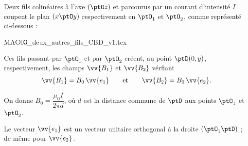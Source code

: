 \hauteurLargeurCadreReponse		{8mm}{5cm}
\initialisationEntrainement

\debutEntrainement

Deux fils colinéaires à l'axe $(\ptO z)$ et parcourus par un courant d'intensité $I$ coupent le plan $(x \ptO y)$ respectivement en $\ptO_1$ et $\ptO_2$, comme représenté ci-dessous :

\begin{center}
{MAG03_deux_autres_fils_CBD_v1.tex}
\end{center}

Ces fils passant par $\ptO_1$ et par $\ptO_2$ créent, au point $\ptD(0,y)$, respectivement, les champs $\vv{B_1}$ et $\vv{B_2}$ vérfiant
\[
\vv{B_1} = B_0\, \vv{e_1} \qquad \text{et} \qquad \vv{B_2} = B_0\, \vv{e_2}.
\]

On donne $B_0=\dfrac{\mu_0 I}{2 \pi d}$,
où $d$ est la distance commune de $\ptD$ aux points $\ptO_1$ et $\ptO_2$.

Le vecteur $\vv{e_1}$ est un vecteur unitaire orthogonal à la droite $(\ptO_1\ptD)$ ; de même pour $\vv{e_2}$.

